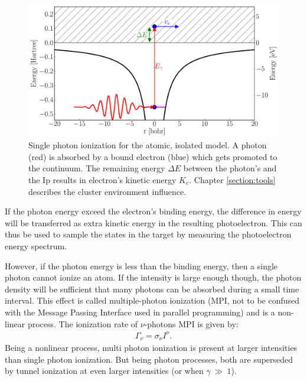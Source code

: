 \begin{figure}
 \centering
 \includegraphics[width=\figurewidth]{figures/ionization_single}
 \caption{Single photon ionization for the atomic, isolated model. A photon
          (red) is absorbed by a bound electron (blue) which gets promoted to
          the continuum. The remaining energy $\Delta E$ between the photon's
          and the Ip results in electron's kinetic energy $K_e$.
          Chapter \ref{section:tools} describes the cluster environment
          influence.}
 \label{fig:ionization:single}
\end{figure}

If the photon energy exceed the electron's binding energy, the difference in energy
will be transferred as extra kinetic energy in the
resulting photoelectron. This can thus be used to sample the states in the
target by measuring the photoelectron energy spectrum\cite{Fennel2010}.

However, if the photon energy is less than the binding energy, then a single
photon cannot ionize an atom. If the intensity is large enough though, the
photon density will be sufficient that many photons can be absorbed during a
small time interval.
This effect is called multiple-photon ionization (MPI, not to
be confused with the Message Passing Interface used in parallel programming) and
is a non-linear process. The ionization rate of $\nu$-photons MPI is given
by\cite{Fennel2010}:
\begin{align}
\Gamma_{\nu} = \sigma_{\nu} I^{\nu}.
\label{eqn:ionization:rate:mpi}
\end{align}
Being a nonlinear process, multi photon ionization is present at larger
intensities than single photon ionization. But being photon processes, both are
superseded by tunnel ionization at even larger intensities (or when
$\gamma~\gg~1$).


{}

